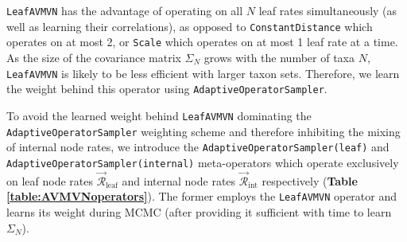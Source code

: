 \documentclass[10pt,letterpaper]{article}
\begin{document}






\texttt{LeafAVMVN} has the advantage of operating on all $N$ leaf rates simultaneously (as well as learning their correlations), as opposed to \texttt{ConstantDistance} which operates on at most 2, or \texttt{Scale} which operates on at most 1 leaf rate at a time. 
As the size of the covariance matrix $\Sigma_N$ grows with the number of taxa $N$, \texttt{LeafAVMVN} is likely to be less efficient with larger taxon sets.
Therefore, we learn the weight behind this operator using \texttt{AdaptiveOperatorSampler}.



To avoid the learned weight behind \texttt{LeafAVMVN} dominating the \texttt{AdaptiveOperatorSampler} weighting scheme and therefore inhibiting the mixing of internal node rates, we 
introduce the \texttt{AdaptiveOperatorSampler(leaf)} and \texttt{AdaptiveOperatorSampler(internal)} meta-operators which operate exclusively on leaf node rates $\vec{\mathcal{R}}^{\,}_\text{leaf}$ and internal node rates $\vec{\mathcal{R}}^{\,}_\text{int}$ respectively  (\textbf{Table \ref{table:AVMVNoperators}}). 
The former employs the \texttt{LeafAVMVN} operator and learns its weight during MCMC (after providing it sufficient with time to learn $\Sigma_N$).
\end{document}
